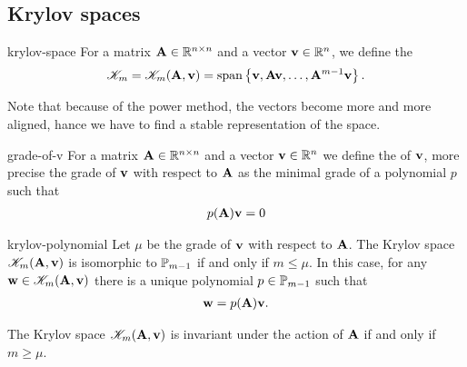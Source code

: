 \subsection{Krylov spaces}

\begin{Definition}{krylov-space}
  For a matrix $\mata\in\Rnn$ and a vector $\vv\in\R^n$, we define the
  \begin{gather}
    \krylov_m = \krylov_m(\mata,\vv)
    = \spann{\vv,\mata\vv,\dots,\mata^{m-1}\vv}.
  \end{gather}
\end{Definition}

\begin{todo}
  Note that because of the power method, the vectors become more and
  more aligned, hance we have to find a stable representation of the
  space.
\end{todo}

\begin{Definition}{grade-of-v}
  For a matrix $\mata\in\Rnn$ and a vector $\vv\in\R^n$ we define the
   of $\vv$, more precise the grade of $\vv$ with
  respect to $\mata$ as the minimal grade of a polynomial $p$ such
  that
  \begin{gather}
    p(\mata)\vv = 0
  \end{gather}
\end{Definition}

\begin{Lemma}{krylov-polynomial}
  Let $\mu$ be the grade of $\vv$ with respect to $\mata$.  The Krylov
  space $\krylov_m(\mata,\vv)$ is isomorphic to $\P_{m-1}$ if and only
  if $m\le \mu$. In this case, for any $\vw\in\krylov_m(\mata,\vv)$
  there is a unique polynomial $p\in\P_{m-1}$ such that
  \begin{gather}
    \label{eq:krylov-polynomial-1}
    \vw = p(\mata)\vv.
  \end{gather}

  The Krylov space $\krylov_m(\mata,\vv)$ is invariant under the
  action of $\mata$ if and only if $m\ge\mu$.
\end{Lemma}

